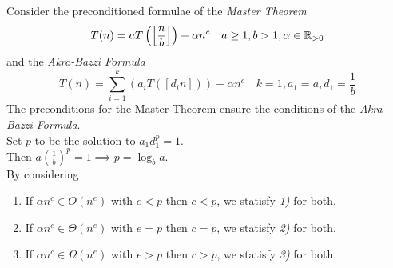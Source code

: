 \documentclass[11pt,a4paper]{article}
\begin{document}
Consider the preconditioned formulae of the \textit{Master Theorem}
$$T(n)=aT\left(\left[\frac{n}{b}\right]\right)+\alpha n^c\quad a\geq1,  b>1, \alpha\in\mathbb{R}_{>0}$$
and the \textit{Akra-Bazzi Formula}
$$T(n) = \sum_{i=1}^k(a_iT([d_in])) + \alpha n^c\quad k=1, a_1=a, d_1=\frac{1}{b}$$
The preconditions for the Master Theorem ensure the conditions of the \textit{Akra-Bazzi Formula}.\\
Set $p$ to be the solution to $a_1d_1^p=1$.\\
Then $a\left(\frac{1}{b}\right)^p=1 \implies p=\log_ba$.\\
By considering
\begin{enumerate}
  \item If $\alpha n^c \in O(n^e)$ with $e<p$ then $c<p$, we statisfy \textit{1)} for both.
  \item If $\alpha n^c \in \Theta(n^e)$ with $e=p$ then $c=p$, we statisfy \textit{2)} for both.
  \item If $\alpha n^c \in \Omega(n^e)$ with $e>p$ then $c>p$, we statisfy \textit{3)} for both.
\end{enumerate}
\end{document}
